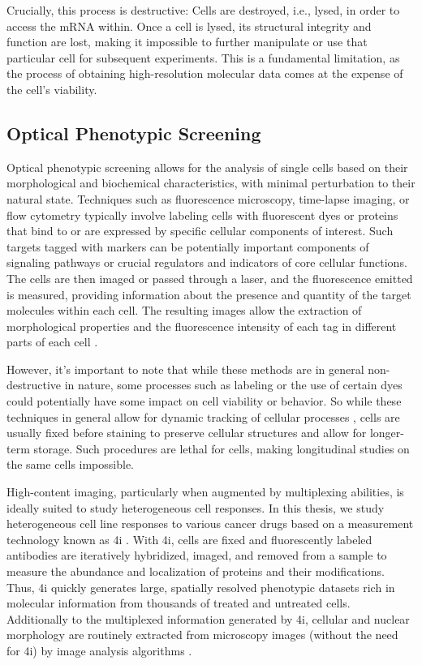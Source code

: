 Crucially, this process is destructive: Cells are destroyed, i.e., lysed, in order to access the mRNA within.
Once a cell is lysed, its structural integrity and function are lost, making it impossible to further manipulate or use that particular cell for subsequent experiments.
This is a fundamental limitation, as the process of obtaining high-resolution molecular data comes at the expense of the cell's viability.

\subsection{Optical Phenotypic Screening}
\label{sec:background_imaging}

Optical phenotypic screening allows for the analysis of single cells based on their morphological and biochemical characteristics, with minimal perturbation to their natural state. 
Techniques such as fluorescence microscopy, time-lapse imaging, or flow cytometry typically involve labeling cells with fluorescent dyes or proteins that bind to or are expressed by specific cellular components of interest.
Such targets tagged with markers can be potentially important components of signaling pathways or crucial regulators and indicators of core cellular functions. 
The cells are then imaged or passed through a laser, and the fluorescence emitted is measured, providing information about the presence and quantity of the target molecules within each cell. 
The resulting images allow the extraction of morphological properties and the fluorescence intensity of each tag in different parts of each cell \citep{carpenter2006cellprofiler}.

However, it's important to note that while these methods are in general non-destructive in nature, some processes such as labeling or the use of certain dyes could potentially have some impact on cell viability or behavior. So while these techniques in general allow for dynamic tracking of cellular processes \citep{fischer2019inferring, hashimoto2016learning, tvarusko1999time, busch2015fundamental}, cells are usually fixed before staining to preserve cellular structures and allow for longer-term storage. Such procedures are lethal for cells, making longitudinal studies on the same cells impossible.

High-content imaging, particularly when augmented by multiplexing abilities, is ideally suited to study heterogeneous cell responses.
In this thesis, we study heterogeneous cell line responses to various cancer drugs based on a measurement technology known as \acrfull{4i} \citep{gut2018multiplexed}.
With 4i, cells are fixed and fluorescently labeled antibodies are iteratively hybridized, imaged, and removed from a sample to measure the abundance and localization of proteins and their modifications. 
Thus, 4i quickly generates large, spatially resolved phenotypic datasets rich in molecular information from thousands of treated and untreated cells. Additionally to the multiplexed information generated by 4i, cellular and nuclear morphology are routinely extracted from microscopy images (without the need for 4i) by image analysis algorithms \citep{carpenter2006cellprofiler}.

